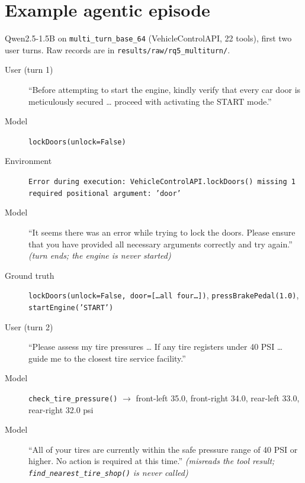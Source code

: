 \begin{table}[h]
  \centering
  \caption{Cost per call: median prompt tokens / median latency in seconds, by catalog size (RTX~3050 Laptop, 4\,GB). Latency benefits from key-value cache reuse across queries that share a catalog; Llama-3.2-3B's cache does not fit in 4\,GB at $N{=}64$.}
  \label{tab:cost}
  \small
  
\end{table}

\section{Example agentic episode}
\label{app:example}

Qwen2.5-1.5B on \texttt{multi\_turn\_base\_64} (VehicleControlAPI, 22 tools), first two user turns. Raw records are in \texttt{results/raw/rq5\_multiturn/}.

\begin{description}
  \item[User (turn 1)] ``Before attempting to start the engine, kindly verify that every car door is meticulously secured \ldots{} proceed with activating the START mode.''
  \item[Model] \texttt{lockDoors(unlock=False)}
  \item[Environment] \texttt{Error during execution: VehicleControlAPI.lockDoors() missing 1 required positional argument: 'door'}
  \item[Model] ``It seems there was an error while trying to lock the doors. Please ensure that you have provided all necessary arguments correctly and try again.'' \emph{(turn ends; the engine is never started)}
  \item[Ground truth] \texttt{lockDoors(unlock=False, door=[\ldots all four\ldots])}, \texttt{pressBrakePedal(1.0)}, \texttt{startEngine('START')}
  \item[User (turn 2)] ``Please assess my tire pressures \ldots{} If any tire registers under 40 PSI \ldots{} guide me to the closest tire service facility.''
  \item[Model] \texttt{check\_tire\_pressure()} $\to$ front-left 35.0, front-right 34.0, rear-left 33.0, rear-right 32.0 psi
  \item[Model] ``All of your tires are currently within the safe pressure range of 40 PSI or higher. No action is required at this time.'' \emph{(misreads the tool result; \texttt{find\_nearest\_tire\_shop()} is never called)}
\end{description}
